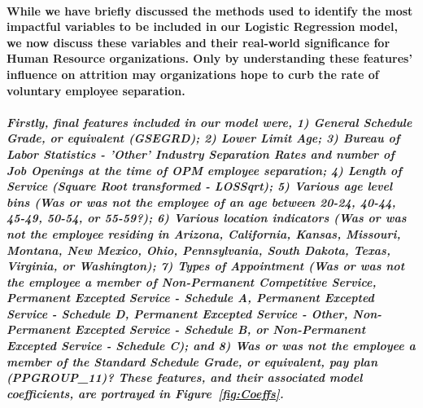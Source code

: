 \documentclass[10pt]{article}
\begin{document}
\paragraph{While we have briefly discussed the methods used to identify the most impactful variables to be included in our Logistic Regression model, we now discuss these variables and their real-world significance for Human Resource organizations. Only by understanding these features' influence on attrition may organizations hope to curb the rate of voluntary employee separation.}

\subparagraph{Firstly, final features included in our model were, 1) General Schedule Grade, or equivalent (GSEGRD); 2) Lower Limit Age; 3) Bureau of Labor Statistics - 'Other' Industry Separation Rates and number of Job Openings at the time of OPM employee separation; 4) Length of Service (Square Root transformed - LOSSqrt); 5) Various age level bins (Was or was not the employee of an age between 20-24, 40-44, 45-49, 50-54, or 55-59?); 6) Various location indicators (Was or was not the employee residing in Arizona, California, Kansas, Missouri, Montana, New Mexico, Ohio, Pennsylvania, South Dakota, Texas, Virginia, or Washington); 7) Types of Appointment (Was or was not the employee a member of Non-Permanent Competitive Service, Permanent Excepted Service - Schedule A, Permanent Excepted Service - Schedule D, Permanent Excepted Service - Other, Non-Permanent Excepted Service - Schedule B, or Non-Permanent Excepted Service - Schedule C); and 8) Was or was not the employee a member of the Standard Schedule Grade, or equivalent, pay plan (PPGROUP\_11)? These features, and their associated model coefficients, are portrayed in Figure~\ref{fig:Coeffs}.}
\end{document}

